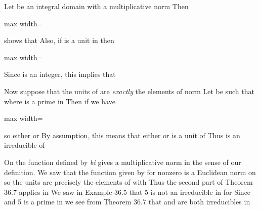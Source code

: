 \documentclass[11pt,oneside]{article}
\begin{document}
\begin{BookBody}
 Let  be an integral domain with a multiplicative norm  Then

\begin{center}\begin{adjustbox}{max width=\linewidth}\end{adjustbox}\end{center}

\noindent shows that  Also, if  is a unit in  then

\begin{center}\begin{adjustbox}{max width=\linewidth}\end{adjustbox}\end{center}

\noindent Since  is an integer, this implies that 

Now suppose that the units of  are\textit{ exactly} the elements of norm  Let  be such that  where  is a prime in  Then if \BookInline{\pi = \alpha \beta,\allowbreak } we have

\begin{center}\begin{adjustbox}{max width=\linewidth}\end{adjustbox}\end{center}

\noindent so either  or  By assumption, this means that either \BookInline{\alpha } or \BookInline{\beta } is a unit of  Thus \BookInline{\pi } is an irreducible of \BookEnd{\blacklozenge}

 On  the function  defined by  \textit{bi} gives a multiplicative norm in the sense of our definition. We saw that the function \BookInline{\nu } given by  for nonzero  is a Euclidean norm on  so the units are precisely the elements \BookInline{\alpha } of  with  Thus the second part of Theorem 36.7 applies in  We saw in Example 36.5 that 5 is not an irreducible in  for  Since  and 5 is a prime in  we see from Theorem 36.7 that  and  are both irreducibles in \BookEnd{\blacktriangle}


\end{BookBody}
\end{document}

